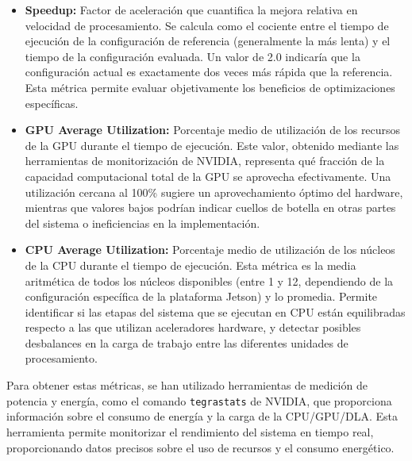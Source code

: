 \documentclass[11pt,spanish,listoffigures,listoftables]{tfgetsinf}
\begin{document}
\begin{itemize}
      \item \textbf{Speedup:} Factor de aceleración que cuantifica la mejora relativa en velocidad de procesamiento. Se calcula como el cociente entre el tiempo de ejecución de la configuración de referencia (generalmente la más lenta) y el tiempo de la configuración evaluada. Un valor de 2.0 indicaría que la configuración actual es exactamente dos veces más rápida que la referencia. Esta métrica permite evaluar objetivamente los beneficios de optimizaciones específicas.

      \item \textbf{GPU Average Utilization:} Porcentaje medio de utilización de los recursos de la GPU durante el tiempo de ejecución. Este valor, obtenido mediante las herramientas de monitorización de NVIDIA, representa qué fracción de la capacidad computacional total de la GPU se aprovecha efectivamente. Una utilización cercana al 100\% sugiere un aprovechamiento óptimo del hardware, mientras que valores bajos podrían indicar cuellos de botella en otras partes del sistema o ineficiencias en la implementación.
      
      \item \textbf{CPU Average Utilization:} Porcentaje medio de utilización de los núcleos de la CPU durante el tiempo de ejecución. Esta métrica es la media aritmética de todos los núcleos disponibles (entre 1 y 12, dependiendo de la configuración específica de la plataforma Jetson) y lo promedia. Permite identificar si las etapas del sistema que se ejecutan en CPU están equilibradas respecto a las que utilizan aceleradores hardware, y detectar posibles desbalances en la carga de trabajo entre las diferentes unidades de procesamiento.

\end{itemize}


Para obtener estas métricas, se han utilizado herramientas de medición de potencia y energía, como el comando \texttt{tegrastats} de NVIDIA, que proporciona información sobre el consumo de energía y la carga de la CPU/GPU/DLA. Esta herramienta permite monitorizar el rendimiento del sistema en tiempo real, proporcionando datos precisos sobre el uso de recursos y el consumo energético.
\end{document}
